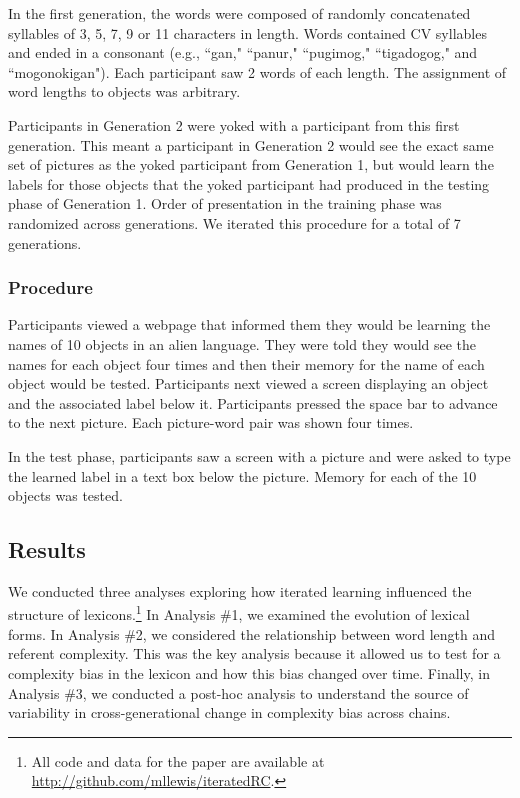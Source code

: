 In the first generation, the words were composed of randomly concatenated syllables of 3, 5, 7, 9 or 11 characters in length. Words contained CV syllables and ended in a consonant (e.g., ``gan," ``panur," ``pugimog," ``tigadogog," and ``mogonokigan"). Each participant saw 2 words of each length. The assignment of word lengths to objects was arbitrary.

Participants in Generation 2 were yoked with a participant from this first generation. This meant a participant in Generation 2 would see the exact same set of pictures as the yoked participant from Generation 1, but would learn the labels for those objects that the yoked participant had produced in the testing phase of Generation 1. Order of presentation in the training phase was randomized across generations. We iterated this procedure for a total of 7 generations.

\subsubsection{Procedure} 


Participants viewed a webpage that informed them they would be learning the names of 10 objects in an alien language. They were told they would see the names for each object four times and then their memory for the name of each object would be tested. Participants next viewed a screen displaying an object and the associated label below it. Participants pressed the space bar to advance to the next picture. Each picture-word pair was shown four times. 

In the test phase, participants saw a screen with a picture and were asked to type the learned label in a text box below the picture. Memory for each of the 10 objects was tested.





\subsection{Results}



We conducted three analyses exploring how iterated learning influenced the structure of lexicons.\footnote{All code and data for the paper are available at \url{http://github.com/mllewis/iteratedRC}.} In Analysis \#1, we examined the evolution of lexical forms. In Analysis \#2, we considered the relationship between word length and referent complexity. This was the key analysis because it allowed us to test for a complexity bias in the lexicon and how this bias changed over time. Finally, in Analysis \#3, we conducted a post-hoc analysis to understand the source of variability in cross-generational change in complexity bias across chains.

